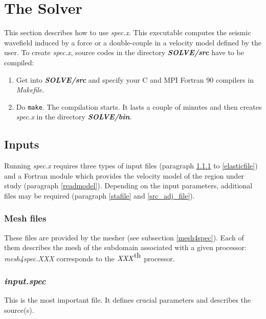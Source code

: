 \section{The Solver}
\label{solve}


This section describes how to use \textit{spec.x}. This executable computes the seismic wavefield
induced by a force or a double-couple in a velocity model defined by the user. To create \textit{spec.x},
source codes in the directory \textit{\bfseries SOLVE/src} have to be compiled:
\begin{enumerate}
\item Get into \textit{\bfseries SOLVE/src} and specify your C and MPI Fortran 90 compilers in
\textit{Makefile}.
\item Do \texttt{make}. The compilation starts. It lasts a couple of minutes and then creates \textit{spec.x}
in the directory \textit{\bfseries SOLVE/bin}.
\end{enumerate}




\subsection{Inputs}


Running \textit{spec.x} requires three types of input files (paragraph \ref{meshfile} to \ref{elasticfile})
and a Fortran module which provides the velocity model of the region under study (paragraph \ref{readmodel}).
Depending on the input parameters, additional files may be required (paragraph \ref{stafile} and
\ref{src_adj_file}).


\subsubsection{Mesh files}
\label{meshfile}

These files are provided by the mesher (see subsection \ref{mesh4spec}). Each of them describes the mesh of
the subdomain associated with a given processor: \textit{mesh4spec.XXX} corresponds to the
$\mbox{\textit{XXX}}^{\mbox{th}}$ processor.


\subsubsection{\textit{input.spec}}
\label{input.spec}

This is the most important file. It defines crucial parameters and describes the source(s).

